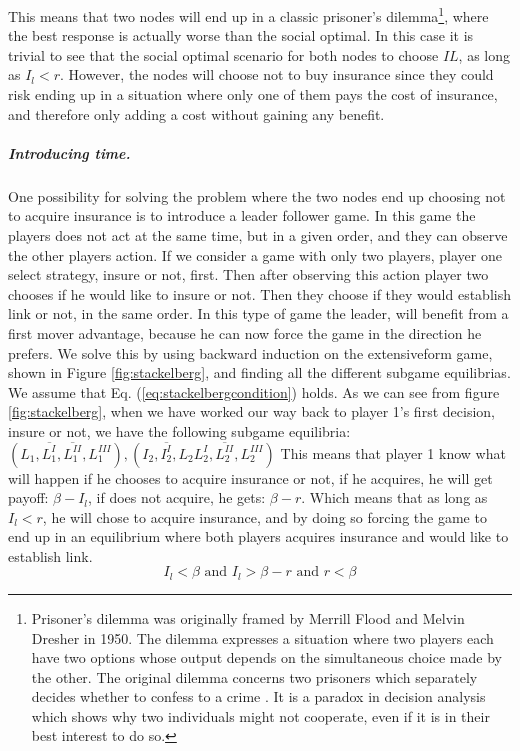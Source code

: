This means that two nodes will end up in a classic prisoner's dilemma\footnote{Prisoner's dilemma was originally framed by Merrill Flood and Melvin Dresher in 1950. The dilemma expresses a situation where two players each have two options whose output depends on the simultaneous choice made by the other. The original dilemma concerns two prisoners which separately decides whether to confess to a crime \cite{oxfordPrisonersDilemma}.
It is a paradox in decision analysis which shows why two individuals might not cooperate, even if it is in their best interest to do so.}, where the best response is actually worse than the social optimal. In this case it is trivial to see that the social optimal scenario for both nodes to choose $IL$, as long as $I_{l}<r$. However, the nodes will choose not to buy insurance since they could risk ending up in a situation where only one of them pays the cost of insurance, and therefore only adding a cost without gaining any benefit. 

  
\subparagraph{Introducing time.}
\label{sec:introducing-time}
One possibility for solving the problem where the two nodes end up choosing not to acquire insurance is to introduce a leader follower game. In this game the players does not act at the same time, but in a given order, and they can observe the other players action.
If we consider a game with only two players, player one select strategy, insure or not, first. Then after observing this action player two chooses if he would like to insure or not. Then they choose if they would establish link or not, in the same order.
In this type of game the leader, will benefit from a first mover advantage, because he can now force the game in the direction he prefers.
We solve this by using backward induction on the extensiveform game, shown in Figure \ref{fig:stackelberg}, and finding all the different subgame equilibrias. We assume that Eq. (\ref{eq:stackelbergcondition}) holds. As we can see from figure \ref{fig:stackelberg}, when we have worked our way back to player 1's first decision, insure or not, we have the following subgame equilibria:$(L_{1},\overline{L^{I}_{1}},\overline{L^{II}_{1}},L^{III}_{1}), (I_{2},\overline{I^{I}_{2}},L_{2}L^{I}_{2},\overline{L^{II}_{2}},L^{III}_{2})$
This means that player 1 know what will happen if he chooses to acquire insurance or not, if he acquires, he will get payoff: $\beta-I_{l}$, if does not acquire, he gets: $\beta-r$. Which means that as long as $I_{l}<r$, he will chose to acquire insurance, and by doing so forcing the game to end up in an equilibrium where both players acquires insurance and would like to establish link.
\begin{equation}
I_{l}<\beta \text{ and } I_{l}>\beta-r \text{ and } r<\beta
\label{eq:stackelbergcondition}
\end{equation}

